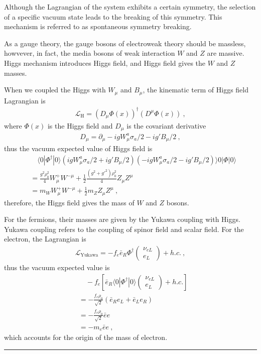 \documentclass[12pt,twoside]{report}
\numberwithin{problemname}{chapter}
\newenvironment{solution}{\vspace{1em}\par\noindent{\large\textbf{\textsc{Solution}}}\par}{\vspace{1em}\hrule}
\begin{document}
\begin{solution}
    Although the Lagrangian of the system exhibits a certain symmetry, the selection of a specific vacuum state leads to the breaking of this symmetry. This mechanism is referred to as spontaneous symmetry breaking.\par
    As a gauge theory, the gauge bosons of electroweak theory should be massless, howvever, in fact, the media bosons of weak interaction $W$ and $Z$ are massive. Higgs mechanism introduces Higgs field, and Higgs field gives the $W$ and $Z$ masses.\par
    When we coupled the Higgs with $W_{\mu}$ and $B_{\mu}$, the kinematic term of Higgs field Lagrangian is
    \begin{align}
        \mathcal{L}_{\text{H}}=(D_{\mu}\Phi(x))^{\dagger}(D^{\mu}\Phi(x))\ ,
    \end{align}
    where $\Phi(x)$ is the Higgs field and $D_{\mu}$ is the covariant derivative
    \begin{align}
        D_{\mu}=\partial_{\mu}-igW^a_{\mu}\sigma_a/2-ig'B_{\mu}/2\ ,
    \end{align}
    thus the vacuum expected value of Higgs field is
    \begin{align}
        &\quad\langle 0|\Phi^{\dagger}|0\rangle(igW^a_{\mu}\sigma_a/2+ig'B_{\mu}/2)(-igW^a_{\mu}\sigma_a/2-ig'B_{\mu}/2)\rangle 0|\Phi|0\rangle \nonumber \\
        &=\frac{g^2\rho^2_0}{4}W^+_{\mu}W^{-\mu}+\frac{1}{2}\frac{(g^2+g'^2)\rho^2_0}{4}Z_{\mu}Z^{\mu} \nonumber \\
        &=m_WW^+_{\mu}W^{-\mu}+\frac{1}{2}m_Z Z_{\mu}Z^{\mu}\ ,
    \end{align}
    therefore, the Higgs field gives the mass of $W$ and $Z$ bosons.\par
    For the fermions, their masses are given by the Yukawa coupling with Higgs. Yukawa coupling refers to the coupling of spinor field and scalar field. For the electron, the Lagrangian is
    \begin{align}
        \mathcal{L}_{\text{Yukawa}}=-f_e\bar{e}_{R}\Phi^{\dagger}\begin{pmatrix}
            \nu_{eL} \\
            e_L
        \end{pmatrix}+h.c.\ ,
    \end{align}
    thus the vacuum expected value is
    \begin{align}
        &\quad -f_e[\bar{e}_{R}\langle 0|\Phi^{\dagger}|0\rangle\begin{pmatrix}
            \nu_{eL} \\
            e_L
        \end{pmatrix}+h.c.] \nonumber \\
        &=-\frac{f_e\rho_0}{\sqrt{2}}(\bar{e}_Re_L+\bar{e}_Le_R) \nonumber \\
        &=-\frac{f_e\rho_0}{\sqrt{2}}\bar{e}e \nonumber \\
        &=-m_e\bar{e}e\ ,
    \end{align}
    which accounts for the origin of the mass of electron.
\end{solution}
\end{document}

